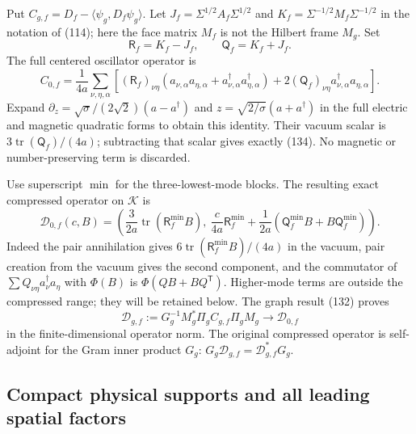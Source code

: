 \documentclass[11pt]{article}
\begin{document}
Put $C_{g,f}=D_f-\langle\psi_g,D_f\psi_g\rangle$.
Let $J_f=\Sigma^{1/2}A_f\Sigma^{1/2}$ and
$K_f=\Sigma^{-1/2}M_f\Sigma^{-1/2}$ in the notation of
(114); here the face matrix $M_f$ is not the Hilbert
frame $M_g$. Set
\[
 \mathsf R_f=K_f-J_f,\qquad \mathsf Q_f=K_f+J_f.
\]
The full centered oscillator operator is
\begin{equation}\label{eq:local-normal-order}
 C_{0,f}=\frac1{4a}\sum_{\nu,\eta,\alpha}
 \left[(\mathsf R_f)_{\nu\eta}
 (a_{\nu,\alpha}a_{\eta,\alpha}
       +a_{\nu,\alpha}^\dagger a_{\eta,\alpha}^\dagger)
       +2(\mathsf Q_f)_{\nu\eta}
                      a_{\nu,\alpha}^\dagger a_{\eta,\alpha}\right].
\end{equation}
Expand $\partial_z=\sqrt{\sigma}/(2\sqrt2)(a-a^\dagger)$
and $z=\sqrt{2/\sigma}(a+a^\dagger)$ in the full electric and
magnetic quadratic forms to obtain this identity.
Their vacuum scalar is $3\operatorname{tr}(\mathsf Q_f)/(4a)$;
subtracting that scalar gives exactly
(134). No magnetic or number-preserving term
is discarded.

Use superscript $\min$ for the three-lowest-mode blocks. The resulting
exact compressed operator on $\mathcal K$ is
\begin{equation}\label{eq:local-compression}
 \mathcal D_{0,f}(c,B)=
 \left(\frac{3}{2a}\operatorname{tr}(\mathsf R_f^{\min}B),
 \ \frac{c}{4a}\mathsf R_f^{\min}
       +\frac1{2a}(\mathsf Q_f^{\min}B+B\mathsf Q_f^{\min})\right).
\end{equation}
Indeed the pair annihilation gives
$6\operatorname{tr}(\mathsf R_f^{\min}B)/(4a)$ in the vacuum,
pair creation from the vacuum gives the second component, and the
commutator of
$\sum Q_{\nu\eta}a_\nu^\dagger a_\eta$ with $\Phi(B)$ is
$\Phi(QB+BQ^{\mathsf T})$. Higher-mode terms are outside the
compressed range; they will be retained below.
The graph result (132) proves
\begin{equation}\label{eq:local-compression-actual}
 \mathcal D_{g,f}:=
 G_g^{-1}M_g^*\Pi_gC_{g,f}\Pi_gM_g
 \longrightarrow\mathcal D_{0,f}
\end{equation}
in the finite-dimensional operator norm. The original compressed
operator is self-adjoint for the Gram inner product $G_g$:
$G_g\mathcal D_{g,f}=\mathcal D_{g,f}^*G_g$.

\subsection{Compact physical supports and all leading spatial factors}
\end{document}
